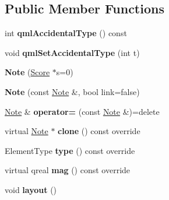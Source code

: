 \subsection*{Public Member Functions}
\begin{DoxyCompactItemize}
\item 
\mbox{\label{class_ms_1_1_note_ad31314f88b1de3c82ccdba30632d253d}} 
int {\bfseries qml\+Accidental\+Type} () const
\item 
\mbox{\label{class_ms_1_1_note_a1eda92f6d5b8b692036e92bd96349e52}} 
void {\bfseries qml\+Set\+Accidental\+Type} (int t)
\item 
\mbox{\label{class_ms_1_1_note_acacaa498757f9823da9fe48345270314}} 
{\bfseries Note} (\hyperlink{class_ms_1_1_score}{Score} $\ast$s=0)
\item 
\mbox{\label{class_ms_1_1_note_ae5a10dad9d3449ec193563d6d407113b}} 
{\bfseries Note} (const \hyperlink{class_ms_1_1_note}{Note} \&, bool link=false)
\item 
\mbox{\label{class_ms_1_1_note_a1795a2af91473808e29b1e088ba4f696}} 
\hyperlink{class_ms_1_1_note}{Note} \& {\bfseries operator=} (const \hyperlink{class_ms_1_1_note}{Note} \&)=delete
\item 
\mbox{\label{class_ms_1_1_note_a7dbb682074b354079e26bdebd317a498}} 
virtual \hyperlink{class_ms_1_1_note}{Note} $\ast$ {\bfseries clone} () const override
\item 
\mbox{\label{class_ms_1_1_note_a88e44f20b100767dc6c10f5d7c5ca5a9}} 
Element\+Type {\bfseries type} () const override
\item 
\mbox{\label{class_ms_1_1_note_a034175a24b61e44fd6109b6572bc4237}} 
virtual qreal {\bfseries mag} () const override
\item 
\mbox{\label{class_ms_1_1_note_a683221c0211d8f22d1b1d6fde5cbc405}} 
void {\bfseries layout} ()
\item 
\mbox{\label{class_ms_1_1_note_a4f229d667261862d0b69981712fee621}} 

\end{DoxyCompactItemize}

